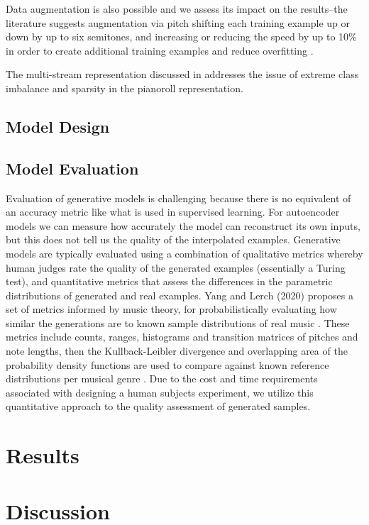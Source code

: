 \documentclass[sigconf,authorversion]{acmart}
\begin{document}
Data augmentation is also possible and we assess its impact on
the results--the literature suggests augmentation via pitch shifting
each training example up or down by up to six semitones, and
increasing or reducing the speed by up to 10\% in order to create
additional training examples and reduce overfitting
\cite{oore_this_2018}.

The multi-stream representation discussed in
\cite{kumar2019polyphonic} addresses the issue of extreme class
imbalance and sparsity in the pianoroll representation.

\subsection{Model Design}

\subsection{Model Evaluation}

Evaluation of generative models is challenging because there is no
equivalent of an accuracy metric like what is used in supervised
learning. For autoencoder models we can measure how accurately the
model can reconstruct its own inputs, but this does not tell us the
quality of the interpolated examples. Generative models are typically
evaluated using a combination of qualitative metrics whereby human
judges rate the quality of the generated examples (essentially a
Turing test), and quantitative metrics that assess the differences in
the parametric distributions of generated and real examples. Yang and
Lerch (2020) proposes a set of metrics informed by music theory, for
probabilistically evaluating how similar the generations are to known
sample distributions of real music \cite{yang_evaluation_2020}. These
metrics include counts, ranges, histograms and transition matrices of
pitches and note lengths, then the Kullback-Leibler divergence and
overlapping area of the probability density functions are used to
compare against known reference distributions per musical genre
\cite{yang_evaluation_2020}. Due to the cost and time requirements
associated with designing a human subjects experiment, we
utilize this quantitative approach to the quality assessment of
generated samples.

\section{Results}

\section{Discussion}



\end{document}
